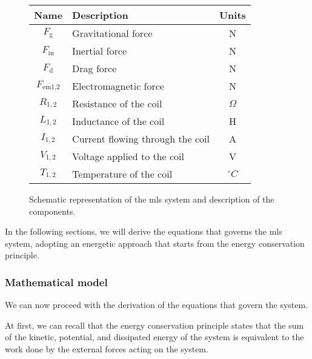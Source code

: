 \begin{figure}[H]
\begin{minipage}{0.55\textwidth}
        \begin{tabular}{|c|l|c|}
            \hline
            \textbf{Name}      & \textbf{Description}             & \textbf{Units} \\
            \hline
            $F_{\text{g}}$     & Gravitational force              & N              \\
            $F_{\text{in}}$    & Inertial force                   & N              \\
            $F_{\text{d}}$     & Drag force                       & N              \\
            $F_{\text{em1,2}}$ & Electromagnetic force            & N              \\
            \hline
            $R_{1,2}$          & Resistance of the coil           & $\Omega$       \\
            $L_{1,2}$          & Inductance of the coil           & H              \\
            $I_{1,2}$          & Current flowing through the coil & A              \\
            $V_{1,2}$          & Voltage applied to the coil      & V              \\
            $T_{1,2}$          & Temperature of the coil          & $^\circ C$     \\
            \hline
        \end{tabular}

    \end{minipage}

    \caption{Schematic representation of the \acrshort{mls} system and description of the components.}
    \label{fig:system_model}
    \label{tab:components}

\end{figure}


In the following sections, we will derive the equations that governs the \acrshort{mls} system, adopting an energetic approach that starts from the energy conservation principle.

\subsubsection{Mathematical model}
\label{subsubsec:mathematical_model}

We can now proceed with the derivation of the equations that govern the system.

At first, we can recall that the energy conservation principle states that the sum of the kinetic, potential, and dissipated energy of the system is equivalent to the work done by the external forces acting on the system.

